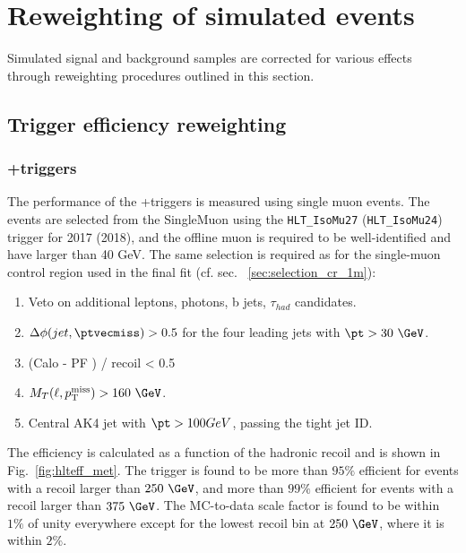 \section{Reweighting of simulated events} \label{sec:reweighting}

Simulated signal and background samples are corrected for various effects through reweighting procedures outlined in this section.

\subsection{Trigger efficiency reweighting}

\subsubsection{\ptmiss+\mht triggers}
The performance of the \ptmiss+\mht triggers is measured using single muon events. The
events are selected from the SingleMuon using the \texttt{HLT\_IsoMu27} (\texttt{HLT\_IsoMu24}) trigger for 2017 (2018), and the offline muon is required to be well-identified and have \pt larger than 40 GeV. The same selection is required as for the single-muon control region used in the final fit (cf. sec. ~\ref{sec:selection_cr_1m}):

\begin{enumerate}
\item Veto on additional leptons, photons, b jets, $\tau_{had}$ candidates.
\item $\Delta\phi(jet,\ptvecmiss)>0.5$ for the four leading jets with $\pt>30~\GeV$.
\item (Calo \ptmiss - PF \ptmiss) / recoil < 0.5
\item $M_{T}(\ell,\ptmiss) > 160~\GeV$.
\item Central AK4 jet with $\pt>100 GeV$, passing the tight jet ID.
\end{enumerate}

The efficiency is calculated as a function of the hadronic recoil \pt and is shown in Fig.~\ref{fig:hlteff_met}.
The trigger is found to be more than $95\%$ efficient for events with a recoil larger than $250~\GeV$, and more than $99\%$ efficient for events with a recoil larger than $375~\GeV$. The MC-to-data scale factor is found to be within $1\%$ of unity everywhere except for the lowest recoil bin at $250~\GeV$, where it is within $2\%$.

